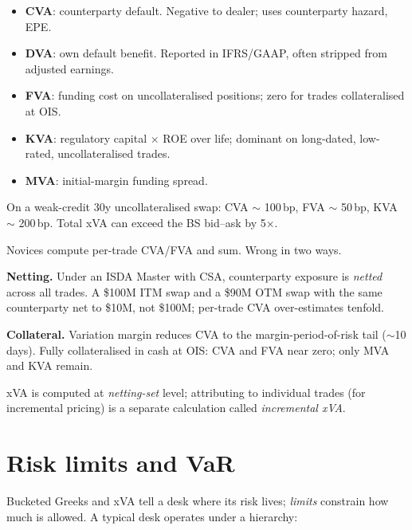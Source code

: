\begin{keyfactbox}
\begin{itemize}
  \item \textbf{CVA}: counterparty default.  Negative to dealer;
    uses counterparty hazard, EPE.
  \item \textbf{DVA}: own default benefit.  Reported in IFRS/GAAP,
    often stripped from adjusted earnings.
  \item \textbf{FVA}: funding cost on uncollateralised positions;
    zero for trades collateralised at OIS.
  \item \textbf{KVA}: regulatory capital $\times$ ROE over life;
    dominant on long-dated, low-rated, uncollateralised trades.
  \item \textbf{MVA}: initial-margin funding spread.
\end{itemize}
On a weak-credit 30y uncollateralised swap: CVA $\sim$ 100\,bp,
FVA $\sim$ 50\,bp, KVA $\sim$ 200\,bp.  Total xVA can exceed the
BS bid--ask by 5$\times$.
\end{keyfactbox}

\begin{pitfallbox}
Novices compute per-trade CVA/FVA and sum.  Wrong in two ways.

\textbf{Netting.}  Under an ISDA Master with CSA, counterparty
exposure is \emph{netted} across all trades.  A \$100M ITM swap
and a \$90M OTM swap with the same counterparty net to \$10M, not
\$100M; per-trade CVA over-estimates tenfold.

\textbf{Collateral.}  Variation margin reduces CVA to the
margin-period-of-risk tail ($\sim$10 days).  Fully collateralised
in cash at OIS: CVA and FVA near zero; only MVA and KVA remain.

xVA is computed at \emph{netting-set} level; attributing to
individual trades (for incremental pricing) is a separate
calculation called \emph{incremental xVA}.
\end{pitfallbox}


\section{Risk limits and VaR}
\label{sec:risk_limits}

Bucketed Greeks and xVA tell a desk where its risk lives;
\emph{limits} constrain how much is allowed.  A typical desk
operates under a hierarchy:

